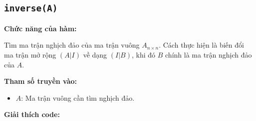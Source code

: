 \documentclass[a4paper,12pt]{report}
\begin{document}
\subsection[inverse(A)]{\texttt{inverse(A)}}

\textbf{Chức năng của hàm:}

Tìm ma trận nghịch đảo của ma trận vuông $A_{n \times n}$. Cách thực hiện là biến đổi ma trận mở rộng $(A|I)$ về dạng $(I|B)$, khi đó $B$ chính là ma trận nghịch đảo của $A$.

\smallskip

\noindent\textbf{Tham số truyền vào:}
\begin{itemize}
    \item $A$: Ma trận vuông cần tìm nghịch đảo.
\end{itemize}

\smallskip

\noindent\textbf{Giải thích code:}
\end{document}
